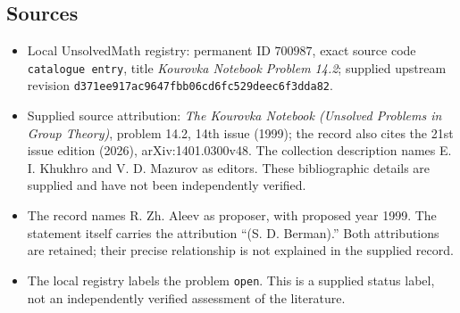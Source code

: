 \documentclass[11pt]{article}
\begin{document}
\subsection{Sources}
\begin{itemize}
\item Local UnsolvedMath registry: permanent ID \(700987\), exact source code \texttt{catalogue entry}, title \emph{Kourovka Notebook Problem 14.2}; supplied upstream revision \texttt{d371ee917ac9647fbb06cd6fc529deec6f3dda82}.
\item Supplied source attribution: \emph{The Kourovka Notebook (Unsolved Problems in Group Theory)}, problem 14.2, 14th issue (1999); the record also cites the 21st issue edition (2026), arXiv:1401.0300v48. The collection description names E. I. Khukhro and V. D. Mazurov as editors. These bibliographic details are supplied and have not been independently verified.
\item The record names R. Zh. Aleev as proposer, with proposed year 1999. The statement itself carries the attribution ``(S. D. Berman).'' Both attributions are retained; their precise relationship is not explained in the supplied record.
\item The local registry labels the problem \texttt{open}. This is a supplied status label, not an independently verified assessment of the literature.
\end{itemize}
\end{document}
